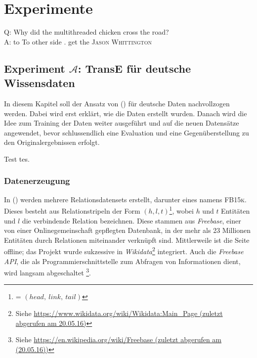 
\chapter{Experimente} %

\label{Chapter5} %


\begin{itquote}
Q: Why did the multithreaded chicken cross the road?\\
A: to To other side . get the
\flushright
\textsc{Jason Whittington}
\end{itquote}

\section{Experiment $\mathcal{A}$: TransE für deutsche Wissensdaten}

In diesem Kapitel soll der Ansatz von (\cite{bordes2013translating}) für deutsche Daten nachvollzogen werden.
Dabei wird erst erklärt, wie die Daten erstellt wurden. Danach wird die Idee zum Training der Daten weiter ausgeführt und
auf die neuen Datensätze angewendet, bevor schlussendlich eine Evaluation und eine Gegenüberstellung zu den Originalergebnissen
erfolgt.

Test tes.

\subsection{Datenerzeugung}

In (\cite{bordes2013translating}) werden mehrere Relationsdatensets erstellt, darunter eines namens \textsc{FB15k}. Dieses
besteht aus Relationstripeln der Form $(h, l, t)$\footnote{= $(head,\ link,\ tail)$}, wobei
$h$ und $t$ Entitäten und $l$ die verbindende Relation bezeichnen. Diese stammen aus \emph{Freebase}, einer
von einer Onlinegemeinschaft gepflegten Datenbank, in der mehr als 23 Millionen Entitäten durch Relationen miteinander verknüpft sind.
Mittlerweile ist die Seite offline; das Projekt wurde sukzessive in \emph{Wikidata}\footnote{Siehe \url{https://www.wikidata.org/wiki/Wikidata:Main_Page (zuletzt abgerufen am 20.05.16)}} integriert. Auch die
\emph{Freebase API}, die als Programmierschnittstelle zum Abfragen von Informationen dient, wird langsam abgeschaltet
\footnote{Siehe \url{https://en.wikipedia.org/wiki/Freebase (zuletzt abgerufen am (20.05.16))}}.\\

